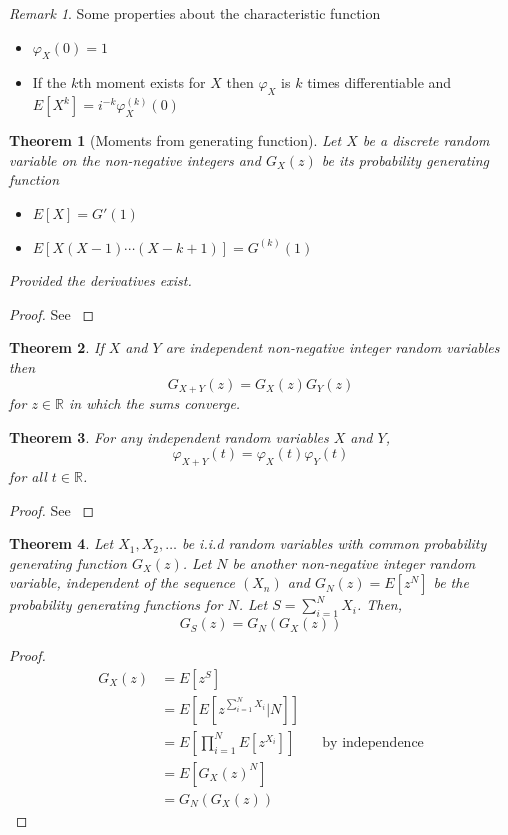 \documentclass{article}
\theoremstyle{plain}
\newtheorem{theorem}{Theorem}[section]
\theoremstyle{definition}
\theoremstyle{remark}
\newtheorem*{remark}{Remark}
\numberwithin{equation}{section}
\newcommand{\R}{\mathbb{R}}
\begin{document}
\begin{remark}
Some properties about the characteristic function
\begin{itemize}
    \item $\varphi_X(0) = 1$
    \item If the $k$th moment exists for $X$ then $\varphi_X$ is $k$ times differentiable and $E[X^k] = i^{-k} \varphi_{X}^{(k)}(0)$
\end{itemize}
\end{remark}

\begin{theorem}[Moments from generating function]
Let $X$ be a discrete random variable on the non-negative integers and $G_X(z)$ be its probability generating function
\begin{itemize}
    \item $E[X] = G'(1)$
    \item $E[X (X - 1) \cdots (X - k + 1)] = G^{(k)}(1)$
\end{itemize}
Provided the derivatives exist.
\end{theorem}

\begin{proof}
See \cite{grimmett2001}
\end{proof}

\begin{theorem}
If $X$ and $Y$ are independent non-negative integer random variables then
$$
G_{X + Y}(z) = G_X(z) G_Y(z)
$$
for $z \in \R$ in which the sums converge.
\end{theorem}

\begin{theorem}
For any independent random variables $X$ and $Y$,
$$
\varphi_{X + Y}(t) = \varphi_X(t) \varphi_Y(t)
$$
for all $t \in \R$.
\end{theorem}

\begin{proof}
See \cite{grimmett2001}
\end{proof}

\begin{theorem}\label{thm:generating_random_sum}
Let $X_1, X_2, \ldots$ be i.i.d random variables with common probability generating function $G_X(z)$.
Let $N$ be another non-negative integer random variable, independent of the sequence $(X_n)$ and $G_N(z) = E[z^N]$ be the probability generating functions for $N$.
Let $S = \sum_{i = 1}^N X_i$.
Then,
$$
G_S(z) = G_N(G_X(z))
$$
\end{theorem}

\begin{proof}
\begin{align*}
    G_X(z) &= E[ z^S ]\\
    &= E[ E[ z^{\sum_{i = 1}^N X_i} | N ]]\\
    &= E \left[ \prod_{i = 1}^N E[z^{X_i}] \right] && \text{by independence}\\
    &= E[ G_X(z)^N]\\
    &= G_N(G_X(z))
\end{align*}
\end{proof}
\end{document}
